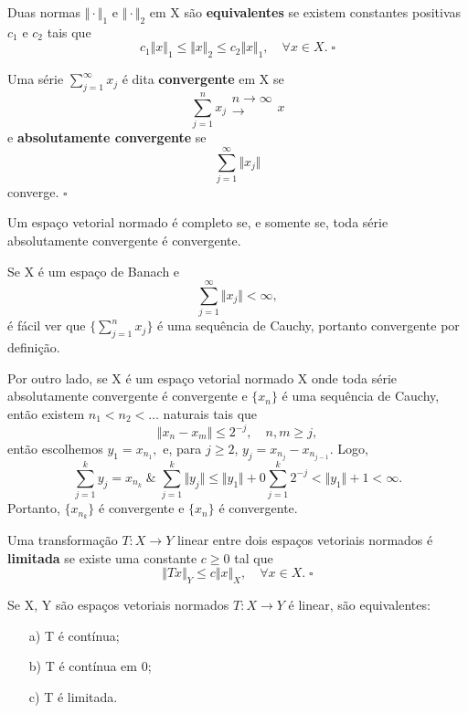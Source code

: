 \documentclass[../functional_analysis.tex]{subfiles}
\begin{document}
\begin{def*}
  Duas normas \(\Vert \cdot  \Vert_{1}\) e \(\Vert \cdot \Vert_{2}\) em X são \textbf{equivalentes} se existem constantes positivas \(c_1\) e \(c_2\) tais que 
    \[
      c_1 \Vert x \Vert_1 \leq \Vert x \Vert_2 \leq c_2\Vert x \Vert_1,\quad \forall x\in X.\; \square
    \]
\end{def*}
\begin{def*}
  Uma série \(\sum\limits_{j=1}^{\infty}x_{j}\) é dita \textbf{convergente} em X se 
    \[
      \sum\limits_{j=1}^{n}x_{j}\substack{n\to \infty \\ \longrightarrow \\ }x
    \]
    e \textbf{absolutamente convergente} se 
      \[
        \sum\limits_{j=1}^{\infty}\Vert x_{j} \Vert
      \]
      converge. \(\square\)
\end{def*}
\begin{theorem*}
  Um espaço vetorial normado é completo se, e somente se, toda série absolutamente convergente é convergente.
\end{theorem*}
\begin{proof*}
  Se X é um espaço de Banach e 
    \[
      \sum\limits_{j=1}^{\infty}\Vert x_{j} \Vert<\infty,
    \]
  é fácil ver que \(\biggl\{ \sum\limits_{j=1}^{n}x_{j}\biggr\}\) é uma sequência de Cauchy, portanto convergente por definição. 

  Por outro lado, se X é um espaço vetorial normado X onde toda série absolutamente convergente é convergente e \(\{x_{n}\}\) é uma sequência de Cauchy, então existem \(n_1<n_2<\dotsc \) naturais tais que 
    \[
      \Vert x_{n}-x_{m} \Vert\leq 2^{-j},\quad n, m\geq j,
    \]
    então escolhemos \(y_1=x_{n_1},\) e, para \(j\geq 2\), \(y_{j}=x_{n_{j}}-x_{n_{j-1}}\). 
    Logo,  
      \[
        \sum\limits_{j=1}^{k}y_{j}=x_{n_{k}}\;\&\; \sum\limits_{j=1}^{k}\Vert y_{j} \Vert\leq \Vert y_1 \Vert +0\sum\limits_{j=1}^{k}2^{-j}<\Vert y_1 \Vert + 1 < \infty.
      \]
    Portanto, \(\{x_{n_{k}}\}\) é convergente e \(\{x_{n}\}\) é convergente. \qedsymbol
\end{proof*}
\begin{def*}
  Uma transformação \(T:X\rightarrow Y\) linear entre dois espaços vetoriais normados é \textbf{limitada} se existe uma constante \(c\geq 0\) tal que 
    \[
      \Vert Tx \Vert_{Y}\leq c \Vert x \Vert_{X}, \quad \forall x\in X.\; \square
    \]
\end{def*}
\begin{prop*}
  Se X, Y são espaços vetoriais normados \(T:X\rightarrow Y\) é linear, são equivalentes: 
 \begin{itemize}
   \item[a)] T é contínua; 
     \item[b)] T é contínua em 0; 
       \item[c)] T é limitada.
 \end{itemize}
\end{prop*}
\end{document}
